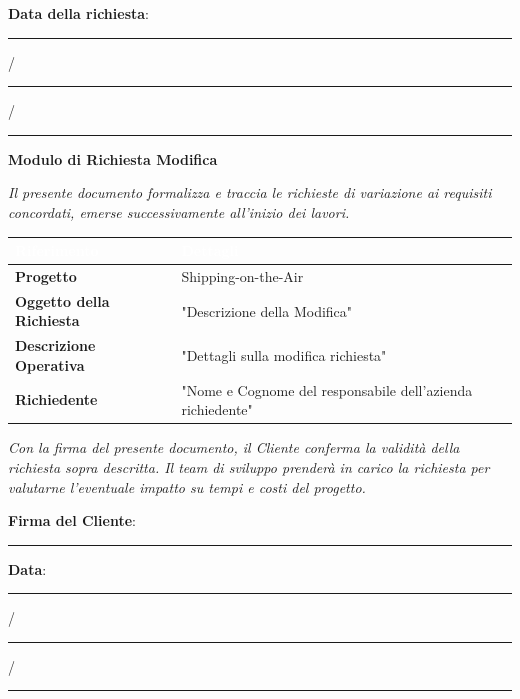 \documentclass[12pt, a4paper]{article}
\begin{document}
\noindent \textbf{Data della richiesta}: \rule{1cm}{0.15mm} / \rule{1cm}{0.15mm} / \rule{1cm}{0.15mm}

\vspace{1.5em}
\begin{center}
    \Large \textbf{Modulo di Richiesta Modifica}
\end{center}
\vspace{0.5em}

\noindent \textit{Il presente documento formalizza e traccia le richieste di variazione ai requisiti concordati, emerse successivamente all'inizio dei lavori.}

\vspace{1.5em}

\begin{table}[htbp]
\centering
\renewcommand{\arraystretch}{1.6}
\begin{tabularx}{\textwidth}{>{\bfseries}l X}
\toprule
\rowcolor{headerblue} 
\textcolor{white}{Riferimento} & \textcolor{white}{Dettagli} \\
\midrule
Progetto & Shipping-on-the-Air \\
Oggetto della Richiesta & "Descrizione della Modifica" \\
Descrizione Operativa & "Dettagli sulla modifica richiesta" \\
Richiedente & "Nome e Cognome del responsabile dell'azienda richiedente" \\
\bottomrule
\end{tabularx}
\end{table}

\vspace{1.5em}

\noindent \small \textit{Con la firma del presente documento, il Cliente conferma la validità della richiesta sopra descritta. Il team di sviluppo prenderà in carico la richiesta per valutarne l'eventuale impatto su tempi e costi del progetto.}

\vspace{2.5em}

\noindent \textbf{Firma del Cliente}: \rule{6cm}{0.15mm} \hfill \textbf{Data}: \rule{1cm}{0.15mm} / \rule{1cm}{0.15mm} / \rule{1cm}{0.15mm}
\end{document}
